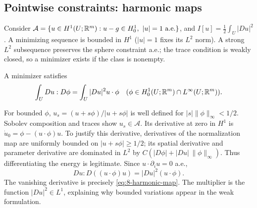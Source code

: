 \Needspace{45mm}
\subsection{Pointwise constraints: harmonic maps}
Consider
$\mathcal A=\{u\in H^1(U;\mathbb{R}^m):u-g\in H^1_0,\ |u|=1\text{ a.e.}\}$,
and $I[u]=\frac12\int_U|Du|^2$.
A minimizing sequence is bounded in $H^1$ ($|u|=1$ fixes its $L^2$ norm).
A strong $L^2$ subsequence preserves the sphere constraint a.e.; the trace
condition is weakly closed, so a minimizer exists if the class is nonempty.
\Needspace{55mm}
\begin{theorem}
A minimizer satisfies
\begin{equation}\label{eq:8-harmonic-map}
 \int_U Du:D\phi=\int_U|Du|^2u\cdot\phi
 \quad(\phi\in H^1_0(U;\mathbb{R}^m)\cap L^\infty(U;\mathbb{R}^m)).
\end{equation}
\end{theorem}
\begin{expandedproof}
For bounded $\phi$, $u_s=(u+s\phi)/|u+s\phi|$ is well defined for
$|s|\|\phi\|_\infty<1/2$. Sobolev composition and traces show
$u_s\in\mathcal A$. Its derivative at zero in $H^1$ is
$\dot u_0=\phi-(u\cdot\phi)u$.
To justify this derivative, derivatives of the normalization map are
uniformly bounded on $|u+s\phi|\geq1/2$; its spatial derivative and
parameter derivative are dominated in $L^2$ by
$C(|D\phi|+|Du|\,\|\phi\|_\infty)$.
Thus differentiating the energy is legitimate.
Since $u\cdot\partial_i u=0$ a.e.,
\[
 Du:D((u\cdot\phi)u)=|Du|^2(u\cdot\phi).
\]
The vanishing derivative is precisely \eqref{eq:8-harmonic-map}.
The multiplier is the function $|Du|^2\in L^1$, explaining why bounded
variations appear in the weak formulation.
\end{expandedproof}
\Needspace{55mm}

\Needspace{45mm}
